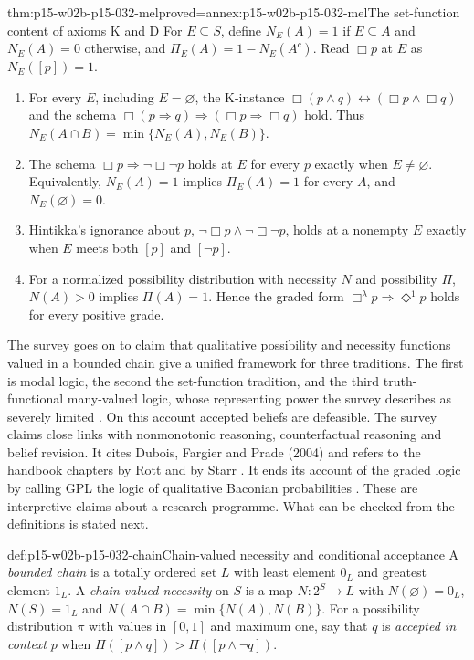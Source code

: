 \begin{hbtheorem}{thm:p15-w02b-p15-032-mel}{proved=annex:p15-w02b-p15-032-mel}{The set-function content of axioms K and D}
For \(E\subseteq S\), define \(N_E(A)=1\) if \(E\subseteq A\) and
\(N_E(A)=0\) otherwise, and \(\Pi_E(A)=1-N_E(A^c)\). Read \(\Box p\) at \(E\) as
\(N_E([p])=1\).
\begin{enumerate}
\item For every \(E\), including \(E=\varnothing\), the K-instance
  \(\Box(p\land q)\leftrightarrow(\Box p\land\Box q)\) and the schema
  \(\Box(p\Rightarrow q)\Rightarrow(\Box p\Rightarrow\Box q)\) hold. Thus
  \(N_E(A\cap B)=\min\{N_E(A),N_E(B)\}\).
\item The schema \(\Box p\Rightarrow\neg\Box\neg p\) holds at \(E\) for every
  \(p\) exactly when \(E\neq\varnothing\). Equivalently, \(N_E(A)=1\) implies
  \(\Pi_E(A)=1\) for every \(A\), and \(N_E(\varnothing)=0\).
\item Hintikka's ignorance about \(p\),
  \(\neg\Box p\land\neg\Box\neg p\), holds at a nonempty \(E\) exactly when
  \(E\) meets both \([p]\) and \([\neg p]\).
\item For a normalized possibility distribution with necessity \(N\) and
  possibility \(\Pi\), \(N(A)>0\) implies \(\Pi(A)=1\). Hence the graded
  form \(\Box^\lambda p\Rightarrow\Diamond^1p\) holds for every positive grade.
\end{enumerate}
\end{hbtheorem}

The survey goes on to claim that qualitative possibility and necessity
functions valued in a bounded chain give a unified framework for three
traditions. The first is modal logic, the second the set-function
tradition, and the third truth-functional many-valued logic, whose
representing power the survey describes as severely limited
\cite{R47CiucciDubois2013}. On this account accepted beliefs are
defeasible. The survey claims close links with nonmonotonic reasoning,
counterfactual reasoning and belief revision. It cites Dubois, Fargier and
Prade (2004) and refers to the handbook chapters by Rott and by Starr
\cite[p.~308]{DuboisPrade2021RepresentingBelief}
\cite{R47DuboisFargierPrade2004}. It ends its account of the graded logic
by calling GPL the logic of qualitative Baconian probabilities
\cite[p.~310]{DuboisPrade2021RepresentingBelief}. These are interpretive
claims about a research programme. What can be checked from the
definitions is stated next.

\begin{hbdefinition}{def:p15-w02b-p15-032-chain}{Chain-valued necessity and conditional acceptance}
A \emph{bounded chain} is a totally ordered set \(L\) with least element
\(0_L\) and greatest element \(1_L\). A \emph{chain-valued necessity} on
\(S\) is a map \(N:2^S\to L\) with \(N(\varnothing)=0_L\),
\(N(S)=1_L\) and \(N(A\cap B)=\min\{N(A),N(B)\}\). For a possibility
distribution \(\pi\) with values in \([0,1]\) and maximum one, say that
\(q\) is \emph{accepted in context} \(p\) when
\(\Pi([p\land q])>\Pi([p\land\neg q])\).
\end{hbdefinition}

